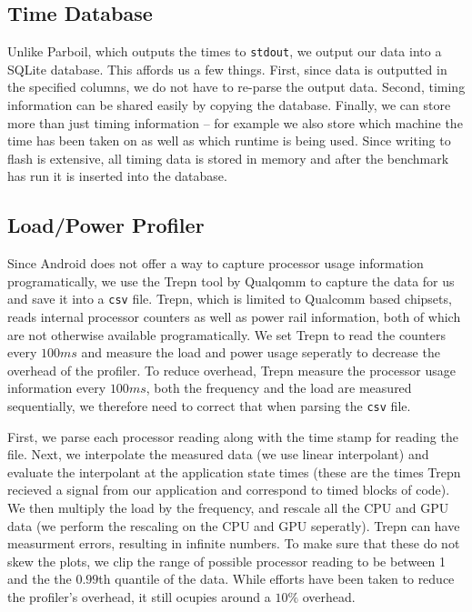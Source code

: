 \subsection{Time Database}

Unlike Parboil, which outputs the times to {\tt stdout}, we output our data into
a SQLite database.  This affords us a few things.  First, since data is outputted
in the specified columns, we do not have to re-parse the output data.  Second,
timing information can be shared easily by copying the database.  Finally, we
can store more than just timing information -- for example we also store which machine the time has been taken on as well as which runtime is being used.
Since writing to flash is extensive, all timing data is stored in memory and after the benchmark has run it is inserted into the database. 

\subsection{Load/Power Profiler}


Since Android does not offer a way to capture processor usage information
  programatically, we use the Trepn tool by Qualqomm to capture the
  data for us and save it into a {\tt csv} file.   
Trepn, which is limited to Qualcomm based chipsets, reads internal processor
  counters as well as power rail information, both of which are not otherwise
  available programatically.
We set Trepn to read the counters every $100ms$ and measure the load and power
  usage seperatly to decrease the overhead of the profiler.
To reduce overhead, Trepn measure the processor usage information every $100ms$, both
  the frequency and the load are measured sequentially, we therefore need to 
  correct that when parsing the {\tt csv} file.

  
First, we parse each processor reading along with the time stamp for reading
  the file.
Next, we interpolate the measured data (we use linear interpolant) and
  evaluate the interpolant at the application state times (these are the
  times Trepn recieved a signal from our application and correspond to
  timed blocks of code).
We then multiply the load by the frequency, and rescale all the CPU and GPU data (we perform the rescaling on the CPU and GPU seperatly).
Trepn can have measurment errors, resulting in infinite numbers.
To make sure that these do not skew the plots, we clip the range of possible processor reading to be between 1 and the the $0.99$th quantile of the data.
While efforts have been taken to reduce the profiler's overhead, it still 
  ocupies around a $10\%$ overhead.


